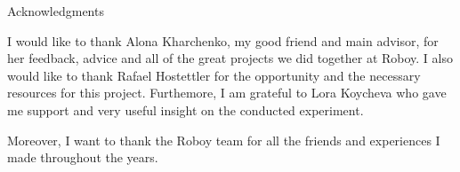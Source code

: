 \makeatletter
{}
{}
{}
\makeatother
\thispagestyle{empty}

\vspace*{20mm}

\begin{center}
\makeatletter
{} Acknowledgments
\makeatother
\end{center}

\vspace{10mm}

I would like to thank Alona Kharchenko, my good friend and main advisor, for her feedback, advice and all of the great projects we did together at Roboy. I also would like to thank Rafael Hostettler for the opportunity and the necessary resources for this project. Furthemore, I am grateful to Lora Koycheva who gave me support and very useful insight on the conducted experiment. 

Moreover, I want to thank the Roboy team for all the friends and experiences I made throughout the years.

\cleardoublepage{}
